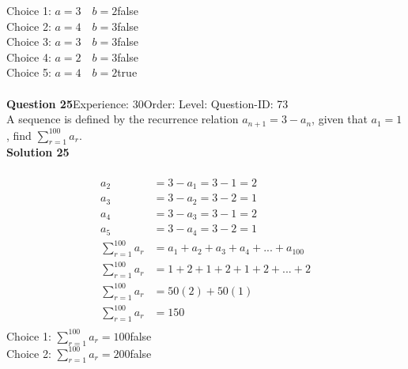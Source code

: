 \documentclass{article}
\begin{document}
Choice 1: \hspace{20pt}$a=3\quad b=2$\hspace{20pt}false\\
Choice 2: \hspace{20pt}$a=4\quad b=3$\hspace{20pt}false\\
Choice 3: \hspace{20pt}$a=3\quad b=3$\hspace{20pt}false\\
Choice 4: \hspace{20pt}$a=2\quad b=3$\hspace{20pt}false\\
Choice 5: \hspace{20pt}$a=4\quad b=2$\hspace{20pt}true\\
\\[4pt]
\noindent\textbf{Question 25}\hspace{20pt}Experience: 30\hspace{20pt}Order: \hspace{20pt}Level: \hspace{20pt}Question-ID: 73\\[2pt]
A sequence is defined by the recurrence relation $a_{n+1}=3-a_n$, given that  $a_1 =1$, find $\displaystyle\sum_{r=1}^{100} a_r$.\\[4pt]
\noindent\textbf{Solution 25}\\[2pt]
\\[-35pt]\begin{align*}
a_2&=3-a_1=3-1=2\\[7pt]
a_3&=3-a_2=3-2=1\\[7pt]
a_4&=3-a_3=3-1=2\\[7pt]
a_5&=3-a_4=3-2=1\\[7pt]
\displaystyle\sum_{r=1}^{100} a_r &= a_1+a_2+a_3+a_4+...+a_{100}\\[2pt]
\displaystyle\sum_{r=1}^{100} a_r &= 1+2+1+2+1+2+...+2\\[2pt]
\displaystyle\sum_{r=1}^{100} a_r &= 50(2)+50(1)\\[2pt]
\displaystyle\sum_{r=1}^{100} a_r &= 150\\[2pt]
\end{align*}
Choice 1: \hspace{20pt}$\displaystyle\sum_{r=1}^{100} a_r = 100$\hspace{20pt}false\\
Choice 2: \hspace{20pt}$\displaystyle\sum_{r=1}^{100} a_r = 200$\hspace{20pt}false\\
\end{document}
